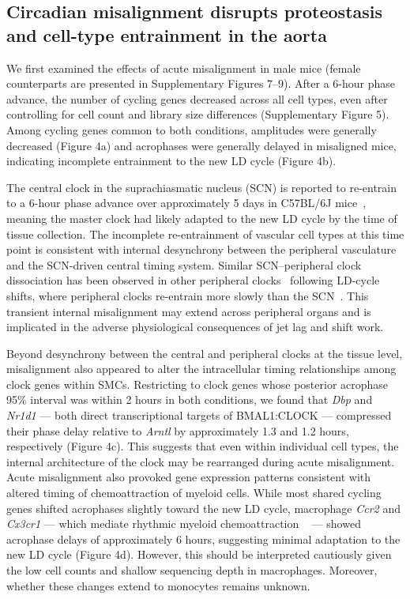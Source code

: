 \documentclass[12pt]{article}
\begin{document}
\subsection*{Circadian misalignment disrupts proteostasis and cell-type entrainment in the aorta}

We first examined the effects of acute misalignment in male mice (female counterparts are presented in Supplementary Figures 7--9). After a 6-hour phase advance, the number of
cycling genes decreased across all cell types, even after controlling for cell count and library
size differences (Supplementary Figure 5). Among cycling genes common to both conditions,
amplitudes were generally decreased (Figure 4a) and acrophases were
generally delayed in misaligned mice, indicating incomplete entrainment to the new LD cycle
(Figure 4b). 

The central clock in the suprachiasmatic nucleus (SCN) is reported to re-entrain to a 6-hour phase advance over approximately 5 days in C57BL/6J mice~\cite{ref144}, meaning the master clock had likely adapted to the new LD cycle by the time of
tissue collection. The incomplete re-entrainment of vascular cell types at this time point is consistent with internal desynchrony between the peripheral vasculature and the SCN-driven central timing system. 
Similar SCN–peripheral clock dissociation has been observed in other peripheral clocks~\cite{ref145} following LD-cycle shifts, where peripheral clocks re-entrain more slowly than the SCN~\cite{ref145,ref146}. 
This transient internal misalignment may extend across peripheral organs and is implicated in the adverse physiological consequences of jet lag and shift work.

Beyond desynchrony between the central and peripheral clocks at the tissue level, misalignment also appeared to alter
the intracellular timing relationships among clock genes within SMCs. Restricting to clock genes
whose posterior acrophase 95\% interval was within 2 hours in both conditions, we found that
\textit{Dbp} and \textit{Nr1d1} --- both direct transcriptional targets of BMAL1:CLOCK ---
compressed their phase delay relative to \textit{Arntl} by approximately 1.3 and 1.2 hours,
respectively (Figure 4c). This suggests that even within individual cell types, the
internal architecture of the clock may be rearranged during acute misalignment. Acute misalignment
also provoked gene expression patterns consistent with altered timing of chemoattraction of myeloid cells. While most shared cycling genes shifted
acrophases slightly toward the new LD cycle, macrophage \textit{Ccr2} and \textit{Cx3cr1} --- which mediate
rhythmic myeloid chemoattraction ~\cite{ref4,ref89,ref90,ref91} --- showed
acrophase delays of approximately 6 hours, suggesting minimal adaptation to the new LD cycle (Figure 4d).
However, this should be interpreted cautiously given the low cell counts and shallow
sequencing depth in macrophages. Moreover, whether these changes extend to monocytes remains unknown.
\end{document}
